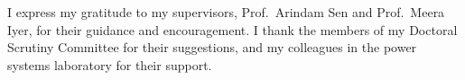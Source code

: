I express my gratitude to my supervisors, Prof.\ Arindam Sen and Prof.\ Meera Iyer, for their
guidance and encouragement. I thank the members of my Doctoral Scrutiny Committee for their
suggestions, and my colleagues in the power systems laboratory for their support.
